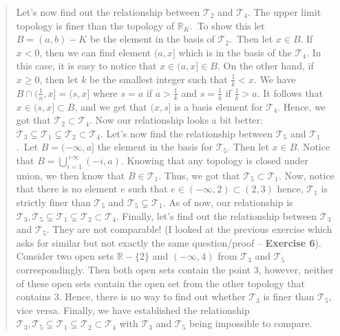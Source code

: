 \documentclass[12pt, a4paper]{article}
\newcommand{\reals}{\mathbb{R}} %
\newcommand{\topology}{\mathcal{T}} %
\begin{document}
\begin{itemize}
\begin{quote}
\newline
\newline
Let's now find out the relationship between $\topology_2$ and $\topology_4$.
\newline
\newline
The upper limit topology is finer than the topology of $\reals_K$.\ To show this let
$B = (a, b) - K$ be the element in the basis of $\topology_2$.\ Then let $x \in B$.
If $x < 0$, then we can find element $(a, x]$ which is in the basis of the $\topology_4$.
In this case, it is easy to notice that $x \in (a, x] \in B$. On the other hand, if $x \geq 0$,
then let $k$ be the smallest integer such that $\frac{1}{k} < x$. We have $B \cap (\frac{1}{n}, x] = (s, x]$
where $s = a$ if $a > \frac{1}{k}$ and $s = \frac{1}{k}$ if $\frac{1}{k} > a$. It follows that
$x \in (s, x] \subset B$, and we get that $(x, s]$ is a basis element for $\topology_4$.
Hence, we got that $\topology_2 \subset \topology_4$.
\newline
\newline
Now our relationship looks a bit better: $\topology_3 \subsetneq \topology_1 \subsetneq \topology_2 \subset \topology_4$.
\newline
\newline
Let's now find the relationship between $\topology_5$ and $\topology_1$.\
Let $B = (-\infty, a]$ the element in the basis for $\topology_5$.
Then let $x \in B$. Notice that $B = \bigcup_{i = 1}^{+\infty}(-i, a)$.
Knowing that any topology is closed under union, we then know that $B \in \topology_1$.
Thus, we got that $\topology_5 \subset \topology_1$. Now, notice that there is no element $e$
such that $e \in (-\infty, 2) \subset (2, 3)$ hence, $\topology_1$ is strictly finer than $\topology_5$
and $\topology_5 \subsetneq \topology_1$.
\newline
\newline
As of now, our relationship is $\topology_3, \topology_5 \subsetneq \topology_1 \subsetneq \topology_2 \subset \topology_4$.
\newline
\newline
Finally, let's find out the relationship between $\topology_3$ and $\topology_5$.
They are not comparable! (I looked at the previous exercise which asks for similar but not exactly the same question/proof -- \textbf{Exercise 6}).
Consider two open sets $\reals - \{2\}$ and $(-\infty, 4)$ from $\topology_3$ and $\topology_5$ correspondingly.
Then both open sets contain the point $3$, however, neither of these open sets contain
the open set from the other topology that contains $3$. Hence, there is no way to find out whether
$\topology_3$ is finer than $\topology_5$, vice versa.
\newline
\newline
Finally, we have established the relationship $\topology_3, \topology_5 \subsetneq \topology_1 \subsetneq \topology_2 \subset \topology_4$
with $\topology_3$ and $\topology_5$ being impossible to compare.
\end{quote}


\end{itemize}
\end{document}
